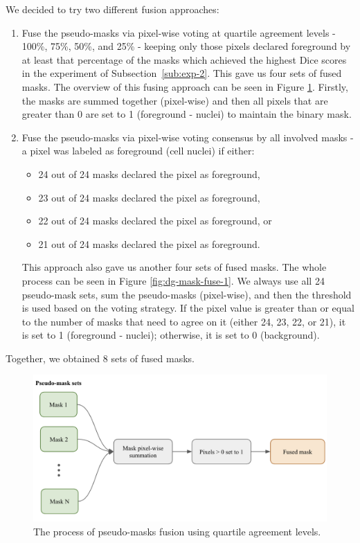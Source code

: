 We decided to try two different fusion approaches:

\begin{enumerate}
  \item Fuse the pseudo-masks via pixel-wise voting at quartile agreement levels - 100\%, 75\%, 50\%, and 25\% - keeping only those pixels declared foreground by at least that percentage of the masks which achieved the highest Dice scores in the experiment of Subsection~\ref{sub:exp-2}. This gave us four sets of fused masks. The overview of this fusing approach can be seen in Figure \ref{fig:dg-mask-fuse-2}. Firstly, the masks are summed together (pixel-wise) and then all pixels that are greater than 0 are set to 1 (foreground - nuclei) to maintain the binary mask.
  \item Fuse the pseudo-masks via pixel-wise voting consensus by all involved masks - a pixel was labeled as foreground (cell nuclei) if either:
  \begin{itemize}
      \item 24 out of 24 masks declared the pixel as foreground,
      \item 23 out of 24 masks declared the pixel as foreground,
      \item 22 out of 24 masks declared the pixel as foreground, or
      \item 21 out of 24 masks declared the pixel as foreground.
  \end{itemize}
  This approach also gave us another four sets of fused masks. The whole process can be seen in Figure \ref{fig:dg-mask-fuse-1}. We always use all 24 pseudo-mask sets, sum the pseudo-masks (pixel-wise), and then the threshold is used based on the voting strategy. If the pixel value is greater than or equal to the number of masks that need to agree on it (either 24, 23, 22, or 21), it is set to 1 (foreground - nuclei); otherwise, it is set to 0 (background).
\end{enumerate}

Together, we obtained 8 sets of fused masks.

\begin{figure}[H]
\begin{centering}
\includegraphics[width=\textwidth]{assets/images/for_presentation/dg-mask-fuse-2.png}
\par\end{centering}
\caption{The process of pseudo-masks fusion using quartile agreement levels.
\label{fig:dg-mask-fuse-2}}
\end{figure}

